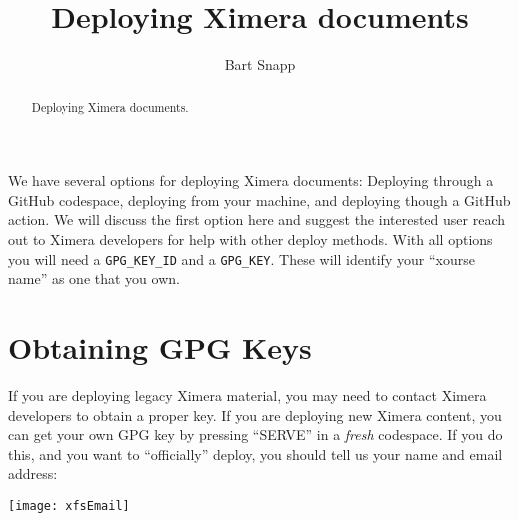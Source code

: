 \documentclass{ximera}
\title{Deploying Ximera documents}
\author{Bart Snapp}
\begin{document}
\pdfOnly{\onecolumn}
\begin{abstract}
    Deploying Ximera documents.
\end{abstract}
\maketitle
{}
        We have several options for deploying Ximera documents: Deploying through a
        GitHub codespace, deploying from your machine, and deploying though a GitHub
        action. We will discuss the first option here and suggest the interested user
        reach out to Ximera developers for help with other deploy methods. With all
        options you will need a
        \verb!GPG_KEY_ID! and a \verb!GPG_KEY!. These will identify your ``xourse name'' as one that you own.
        
        \section{Obtaining GPG Keys}

        If you are deploying legacy Ximera material, you may need to contact Ximera
        developers to obtain a proper key. If you are deploying new Ximera content,
        you can get your own GPG key by pressing ``SERVE'' in a \textit{fresh} codespace. If
        you do this, and you want to ``officially'' deploy, you should tell us your
        name and email address:
        \pdfOnly{\end{multicols}}\pdfOnly{\enlargethispage{2em}}
\begin{image}
    \texttt{[image: xfsEmail]}
\end{image}
\pdfOnly{\newpage}
    
\end{document}

